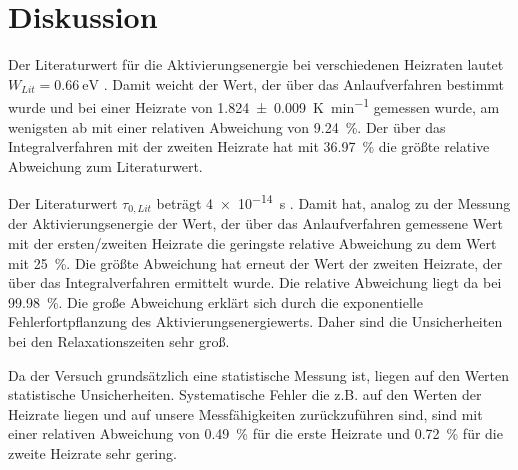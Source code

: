 \section{Diskussion}
\label{sec:Diskussion}

Der Literaturwert für die Aktivierungsenergie bei verschiedenen Heizraten lautet ${W_{Lit} = \SI{0.66}{\electronvolt}}$ \cite{lit}. Damit weicht der Wert, der über das Anlaufverfahren bestimmt wurde und bei einer Heizrate von \SI{1.824(9)}{\kelvin\per\minute} gemessen wurde, am wenigsten ab mit einer relativen Abweichung von \SI{9.24}{\percent}. Der über das Integralverfahren mit der zweiten Heizrate hat mit \SI{36.97}{\percent} die größte relative Abweichung zum Literaturwert.

Der Literaturwert $\tau_{0, Lit}$ beträgt \SI{4e-14}{\second} \cite{lit}. Damit hat, analog zu der Messung der Aktivierungsenergie der Wert, der über das Anlaufverfahren gemessene Wert mit der ersten/zweiten Heizrate die geringste relative Abweichung zu dem Wert mit \SI{25}{\percent}. 
Die größte Abweichung hat erneut der Wert der zweiten Heizrate, der über das Integralverfahren ermittelt wurde. 
Die relative Abweichung liegt da bei \SI{99.98}{\percent}. 
Die große Abweichung erklärt sich durch die exponentielle Fehlerfortpflanzung des Aktivierungsenergiewerts. Daher sind die Unsicherheiten bei den Relaxationszeiten sehr groß.

Da der Versuch grundsätzlich eine statistische Messung ist, liegen auf den Werten statistische Unsicherheiten. Systematische Fehler die z.B. auf den Werten der Heizrate liegen und auf unsere Messfähigkeiten zurückzuführen sind, sind mit einer relativen Abweichung von \SI{0.49}{\percent} für die erste Heizrate und \SI{0.72}{\percent} für die zweite Heizrate sehr gering.